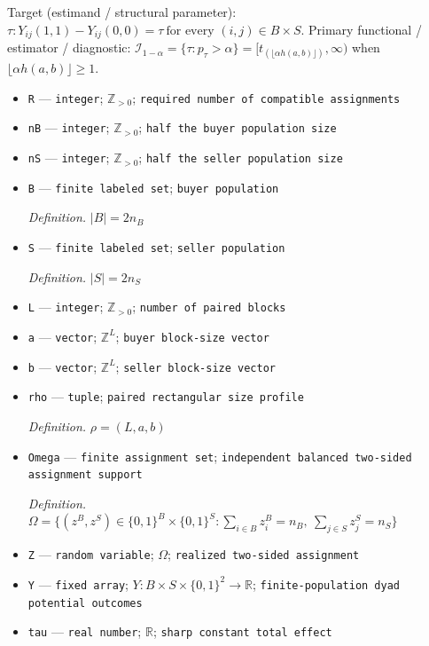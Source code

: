 \documentclass{article}
\begin{document}
Target (estimand / structural parameter): \(\tau:Y_{ij}(1,1)-Y_{ij}(0,0)=\tau\ \text{for every }(i,j)\in B\times S\).
Primary functional / estimator / diagnostic: \(\mathcal I_{1-\alpha}=\{\tau:p_\tau>\alpha\}=[t_{(\lfloor\alpha h(a,b)\rfloor)},\infty)\) when \(\lfloor\alpha h(a,b)\rfloor\ge1\).
\begin{itemize}
  \item \texttt{R} --- \texttt{integer}; \(\mathbb Z_{>0}\); \texttt{required number of compatible assignments}
  \item \texttt{nB} --- \texttt{integer}; \(\mathbb Z_{>0}\); \texttt{half the buyer population size}
  \item \texttt{nS} --- \texttt{integer}; \(\mathbb Z_{>0}\); \texttt{half the seller population size}
  \item \texttt{B} --- \texttt{finite labeled set}; \texttt{buyer population}
  \par\smallskip\noindent\emph{Definition.} \(|B|=2n_B\)
  \item \texttt{S} --- \texttt{finite labeled set}; \texttt{seller population}
  \par\smallskip\noindent\emph{Definition.} \(|S|=2n_S\)
  \item \texttt{L} --- \texttt{integer}; \(\mathbb Z_{>0}\); \texttt{number of paired blocks}
  \item \texttt{a} --- \texttt{vector}; \(\mathbb Z^{L}\); \texttt{buyer block-\allowbreak{}size vector}
  \item \texttt{b} --- \texttt{vector}; \(\mathbb Z^{L}\); \texttt{seller block-\allowbreak{}size vector}
  \item \texttt{rho} --- \texttt{tuple}; \texttt{paired rectangular size profile}
  \par\smallskip\noindent\emph{Definition.} \(\rho=(L,a,b)\)
  \item \texttt{Omega} --- \texttt{finite assignment set}; \texttt{independent balanced two-\allowbreak{}sided assignment support}
  \par\smallskip\noindent\emph{Definition.} \(\Omega=\{(z^B,z^S)\in\{0,1\}^{B}\times\{0,1\}^{S}:\sum_{i\in B}z_i^B=n_B,\ \sum_{j\in S}z_j^S=n_S\}\)
  \item \texttt{Z} --- \texttt{random variable}; \(\Omega\); \texttt{realized two-\allowbreak{}sided assignment}
  \item \texttt{Y} --- \texttt{fixed array}; \(Y:B\times S\times\{0,1\}^2\to\mathbb R\); \texttt{finite-\allowbreak{}population dyad potential outcomes}
  \item \texttt{tau} --- \texttt{real number}; \(\mathbb R\); \texttt{sharp constant total effect}

\end{itemize}
\end{document}
